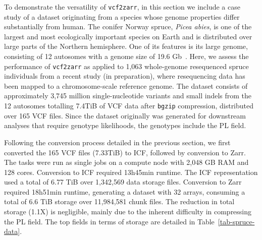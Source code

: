 \documentclass[a4paper,num-refs]{oup-contemporary}
\begin{document}
To demonstrate the versatility of \texttt{vcf2zarr}, in this section
we include a case study of a dataset originating from a species whose
genome properties differ substantially from human. The conifer Norway
spruce, \emph{Picea abies}, is one of the largest and most
ecologically important species on Earth and is distributed over large
parts of the Northern hemisphere. One of its features is its large
genome, consisting of 12 autosomes with a genome size of 19.6
Gb~\cite{nystedt_NorwaySpruceGenome_2013}. Here, we assess the
performance of \texttt{vcf2zarr} as applied to 1,063 whole-genome
resequenced spruce individuals from a recent study (in preparation),
where resequencing data has been mapped to a chromosome-scale
reference genome. The dataset consists of approximately 3,745 million
single-nucleotide variants and small indels from the 12 autosomes
totalling 7.4TiB of VCF data after \texttt{bgzip} compression,
distributed over 165 VCF files. Since the dataset originally was
generated for downstream analyses that require genotype likelihoods,
the genotypes include the PL field.

Following the conversion process detailed in the previous section, we
first converted the 165 VCF files (7.33TiB) to ICF, followed by
conversion to Zarr. The tasks were run as single jobs on a compute
node with 2,048 GB RAM and 128 cores. Conversion to ICF required
13h45min runtime. The ICF representation used a total of 6.77 TiB over
1,342,569 data storage files. Conversion to Zarr required 18h51min
runtime, generating a dataset with 32 arrays, consuming a total of 6.6
TiB storage over 11,984,581 chunk files. The reduction in total
storage (1.1X) is negligible, mainly due to the inherent difficulty in
compressing the PL field. The top fields in terms of storage are
detailed in Table~\ref{tab-spruce-data}.
\end{document}
